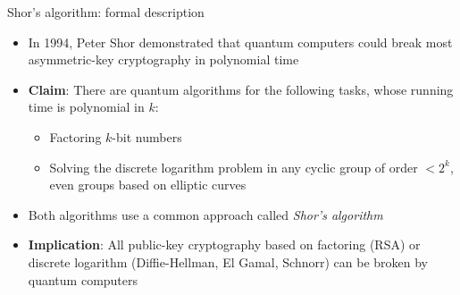 \documentclass[aspectratio=169, lualatex, handout]{beamer}
\begin{document}
\begin{frame}{Shor's algorithm: formal description}
	\begin{itemize}
		\item In 1994, Peter Shor demonstrated that quantum computers could break most asymmetric-key cryptography in polynomial time
		\item \textbf{Claim}: There are quantum algorithms for the following tasks, whose running time is polynomial in $k$:
		      \begin{itemize}
			      \item Factoring $k$-bit numbers
			      \item Solving the discrete logarithm problem in any cyclic group of order $< 2^k$, even groups based on elliptic curves
		      \end{itemize}
		\item Both algorithms use a common approach called \textit{Shor's algorithm}
		\item \textbf{Implication}: All public-key cryptography based on factoring (RSA) or discrete logarithm (Diffie-Hellman, El Gamal, Schnorr) can be broken by quantum computers
	\end{itemize}
\end{frame}
\end{document}
